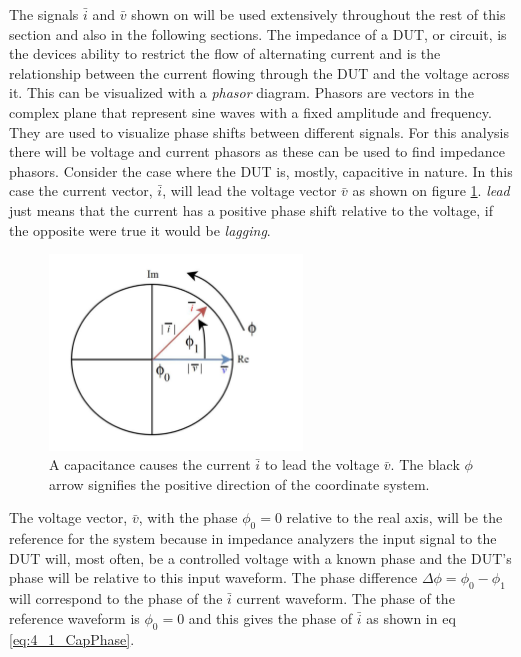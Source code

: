 The signals $\bar i$ and $\bar v$ shown on  will be used extensively throughout the rest of this section and also in the following sections. The impedance of a DUT, or circuit, is the devices ability to restrict the flow of alternating current and is the relationship between the current flowing through the DUT and the voltage across it. This can be visualized with a \textit{phasor} diagram. Phasors are vectors in the complex plane that represent sine waves with a fixed amplitude and frequency. They are used to visualize phase shifts between different signals. For this analysis there will be voltage and current phasors as these can be used to find impedance phasors. Consider the case where the DUT is, mostly, capacitive in nature. In this case the current vector, $\bar i$, will lead the voltage vector $\bar v$ as shown on figure \ref{fig:4_1_CapPhasor}. \textit{lead} just means that the current has a positive phase shift relative to the voltage, if the opposite were true it would be \textit{lagging}.

\begin{figure}[H]
    \centering
    \includegraphics[clip, trim=0 0 0 0, width=0.60\textwidth]{Sections/4_TechnicalAnalysis/Figures/4_1_CapacitancePhasor.pdf}
    \caption{A capacitance causes the current $\bar i$ to lead the voltage $\bar v$. The black $\phi$ arrow signifies the positive direction of the coordinate system.}
    \label{fig:4_1_CapPhasor}
\end{figure}

The voltage vector, $\bar v$, with the phase $\phi_0 = 0$ relative to the real axis, will be the reference for the system because in impedance analyzers the input signal to the DUT will, most often, be a controlled voltage with a known phase and the DUT's phase will be relative to this input waveform. The phase difference $\Delta \phi = \phi_0 - \phi_1$ will correspond to the phase of the $\bar i$ current waveform. The phase of the reference waveform is $\phi_0 = 0$ and this gives the phase of $\bar i$ as shown in eq \ref{eq:4_1_CapPhase}.

